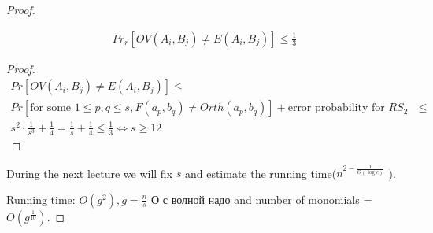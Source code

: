 \begin{proof}
\begin{lm}
\begin{lm}
			\begin{align*}
				Pr_r[OV(A_i, B_j) \neq E(A_i, B_j)] \leq \frac{1}{3}
			\end{align*}

		\end{lm}

		\begin{proof}
			\begin{align*}
				Pr[OV(A_i, B_j) \neq E(A_i, B_j)] \leq \\ Pr[\text{for some }1 \leq p, q \leq s, F(a_p, b_q) \neq Orth(a_p, b_q)] + \text{error probability for $RS_2$ } \leq \\ s^2 \cdot \frac{1}{s^3} + \frac{1}{4} = \frac{1}{s} + \frac{1}{4} \leq \frac{1}{3} \Leftrightarrow s \geq 12
			\end{align*}
		\end{proof}



	\end{lm}


	During the next lecture we will fix $s$ and estimate the running time($n^{2-\frac{1}{O(\log c)}}$ ).

	Running time: $O(g^2), g=\frac{n}{s}$ {\color{red} О с волной надо} and number of monomials = $O(g^{\frac{1}{10}})$.


\end{proof}
